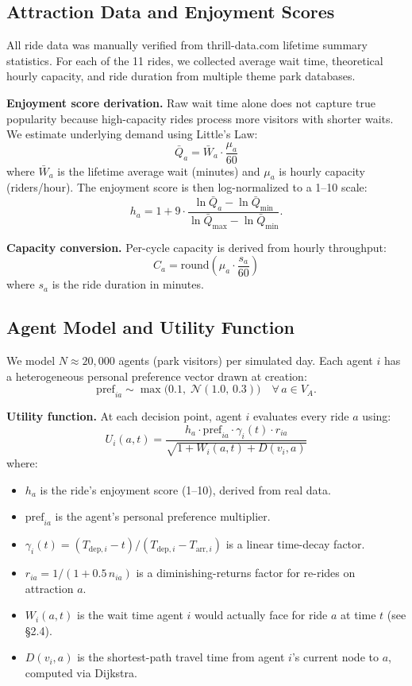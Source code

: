 \documentclass[11pt]{article}
\begin{document}
\subsection{Attraction Data and Enjoyment Scores}

All ride data was manually verified from thrill-data.com lifetime summary statistics. For each of the 11 rides, we collected average wait time, theoretical hourly capacity, and ride duration from multiple theme park databases.

\textbf{Enjoyment score derivation.} Raw wait time alone does not capture true popularity because high-capacity rides process more visitors with shorter waits. We estimate underlying demand using Little's Law:
\[
\bar{Q}_a = \bar{W}_a \cdot \frac{\mu_a}{60}
\]
where $\bar{W}_a$ is the lifetime average wait (minutes) and $\mu_a$ is hourly capacity (riders/hour). The enjoyment score is then log-normalized to a 1--10 scale:
\[
h_a = 1 + 9 \cdot \frac{\ln \bar{Q}_a - \ln \bar{Q}_{\min}}{\ln \bar{Q}_{\max} - \ln \bar{Q}_{\min}}.
\]

\textbf{Capacity conversion.} Per-cycle capacity is derived from hourly throughput:
\[
C_a = \text{round}\!\left(\mu_a \cdot \frac{s_a}{60}\right)
\]
where $s_a$ is the ride duration in minutes.

\subsection{Agent Model and Utility Function}

We model $N \approx 20{,}000$ agents (park visitors) per simulated day. Each agent $i$ has a heterogeneous personal preference vector drawn at creation:
\[
\text{pref}_{ia} \sim \max\!\big(0.1,\; \mathcal{N}(1.0,\, 0.3)\big) \quad \forall\, a \in V_A.
\]

\textbf{Utility function.} At each decision point, agent $i$ evaluates every ride $a$ using:
\[
U_i(a, t) = \frac{h_a \cdot \text{pref}_{ia} \cdot \gamma_i(t) \cdot r_{ia}}{\sqrt{1 + W_i(a, t) + D(v_i, a)}}
\]
where:
\begin{itemize}[nosep]
    \item $h_a$ is the ride's enjoyment score (1--10), derived from real data.
    \item $\text{pref}_{ia}$ is the agent's personal preference multiplier.
    \item $\gamma_i(t) = (T_{\text{dep},i} - t) / (T_{\text{dep},i} - T_{\text{arr},i})$ is a linear time-decay factor.
    \item $r_{ia} = 1 / (1 + 0.5\, n_{ia})$ is a diminishing-returns factor for re-rides on attraction $a$.
    \item $W_i(a, t)$ is the wait time agent $i$ would actually face for ride $a$ at time $t$ (see \S2.4).
    \item $D(v_i, a)$ is the shortest-path travel time from agent $i$'s current node to $a$, computed via Dijkstra.
\end{itemize}
\end{document}
